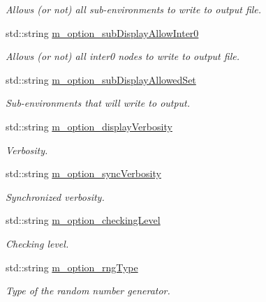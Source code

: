 \begin{DoxyCompactItemize}
\begin{DoxyCompactList}\small\item\em Allows (or not) all sub-\/environments to write to output file. \end{DoxyCompactList}\item 
std\-::string \hyperlink{class_q_u_e_s_o_1_1_environment_options_acf680dfdb7d9d91d0154a65d973359a8}{m\-\_\-option\-\_\-sub\-Display\-Allow\-Inter0}
\begin{DoxyCompactList}\small\item\em Allows (or not) all inter0 nodes to write to output file. \end{DoxyCompactList}\item 
std\-::string \hyperlink{class_q_u_e_s_o_1_1_environment_options_aaf46a8974310e00a7569c004736a0f2b}{m\-\_\-option\-\_\-sub\-Display\-Allowed\-Set}
\begin{DoxyCompactList}\small\item\em Sub-\/environments that will write to output. \end{DoxyCompactList}\item 
std\-::string \hyperlink{class_q_u_e_s_o_1_1_environment_options_a4f89e406c541712444f057a871a9c721}{m\-\_\-option\-\_\-display\-Verbosity}
\begin{DoxyCompactList}\small\item\em Verbosity. \end{DoxyCompactList}\item 
std\-::string \hyperlink{class_q_u_e_s_o_1_1_environment_options_a009eab8a08fe215cd9a6efe81010037d}{m\-\_\-option\-\_\-sync\-Verbosity}
\begin{DoxyCompactList}\small\item\em Synchronized verbosity. \end{DoxyCompactList}\item 
std\-::string \hyperlink{class_q_u_e_s_o_1_1_environment_options_acd9571003814792e4214aab6969cc397}{m\-\_\-option\-\_\-checking\-Level}
\begin{DoxyCompactList}\small\item\em Checking level. \end{DoxyCompactList}\item 
std\-::string \hyperlink{class_q_u_e_s_o_1_1_environment_options_afe9a3368caa5bcc6466bb958a43221bc}{m\-\_\-option\-\_\-rng\-Type}
\begin{DoxyCompactList}\small\item\em Type of the random number generator. \end{DoxyCompactList}\item 

\end{DoxyCompactItemize}
